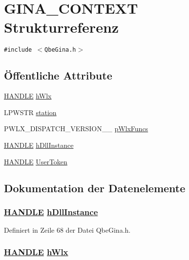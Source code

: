 \hypertarget{structGINA__CONTEXT}{
\section{GINA\_\-CONTEXT Strukturreferenz}
\label{structGINA__CONTEXT}
}
{\tt \#include $<$Qbe\-Gina.h$>$}

\subsection*{\"{O}ffentliche Attribute}
\begin{CompactItemize}
\item 
\hyperlink{QbeGina_8h_a0}{HANDLE} \hyperlink{structGINA__CONTEXT_GINA__CONTEXTo0}{h\-Wlx}
\item 
LPWSTR \hyperlink{structGINA__CONTEXT_GINA__CONTEXTo1}{station}
\item 
PWLX\_\-DISPATCH\_\-VERSION\_\_ \hyperlink{structGINA__CONTEXT_GINA__CONTEXTo2}{p\-Wlx\-Funcs}
\item 
\hyperlink{QbeGina_8h_a0}{HANDLE} \hyperlink{structGINA__CONTEXT_GINA__CONTEXTo3}{h\-Dll\-Instance}
\item 
\hyperlink{QbeGina_8h_a0}{HANDLE} \hyperlink{structGINA__CONTEXT_GINA__CONTEXTo4}{User\-Token}
\end{CompactItemize}


\subsection{Dokumentation der Datenelemente}
\hypertarget{structGINA__CONTEXT_GINA__CONTEXTo3}{
\subsubsection[hDllInstance]{\setlength{\rightskip}{0pt plus 5cm}\hyperlink{QbeGina_8h_a0}{HANDLE} \hyperlink{structGINA__CONTEXT_GINA__CONTEXTo3}{h\-Dll\-Instance}}}
\label{structGINA__CONTEXT_GINA__CONTEXTo3}




Definiert in Zeile 68 der Datei Qbe\-Gina.h.\hypertarget{structGINA__CONTEXT_GINA__CONTEXTo0}{
\subsubsection[hWlx]{\setlength{\rightskip}{0pt plus 5cm}\hyperlink{QbeGina_8h_a0}{HANDLE} \hyperlink{structGINA__CONTEXT_GINA__CONTEXTo0}{h\-Wlx}}}
\label{structGINA__CONTEXT_GINA__CONTEXTo0}




